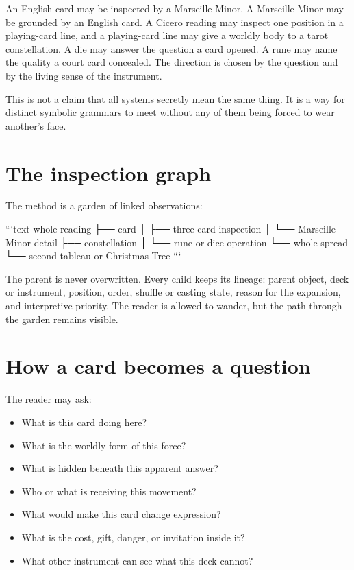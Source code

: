 An English card may be inspected by a Marseille Minor. A Marseille Minor may be
grounded by an English card. A Cicero reading may inspect one position in a
playing-card line, and a playing-card line may give a worldly body to a tarot
constellation. A die may answer the question a card opened. A rune may name the
quality a court card concealed. The direction is chosen by the question and by
the living sense of the instrument.

This is not a claim that all systems secretly mean the same thing. It is a way
for distinct symbolic grammars to meet without any of them being forced to
wear another's face.

\section{The inspection graph}

The method is a garden of linked observations:

```text
whole reading
 ├── card
 │    ├── three-card inspection
 │    └── Marseille-Minor detail
 ├── constellation
 │    └── rune or dice operation
 └── whole spread
      └── second tableau or Christmas Tree
```

The parent is never overwritten. Every child keeps its lineage: parent object,
deck or instrument, position, order, shuffle or casting state, reason for the
expansion, and interpretive priority. The reader is allowed to wander, but the
path through the garden remains visible.

\section{How a card becomes a question}

The reader may ask:

\begin{itemize}
\item What is this card doing here?
\item What is the worldly form of this force?
\item What is hidden beneath this apparent answer?
\item Who or what is receiving this movement?
\item What would make this card change expression?
\item What is the cost, gift, danger, or invitation inside it?
\item What other instrument can see what this deck cannot?
\end{itemize}

